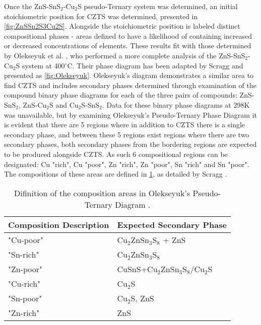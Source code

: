 Once the ZnS-SnS$_2$-Cu$_2$S pseudo-Ternary system was determined, an initial stoichiometric position for CZTS was determined, presented in \ref{fig:ZnSSn2S3Cu2S}. Alongside the stoichiometric position is labeled distinct compositional phases - areas defined to have a likelihood of containing increased or decreased concentrations of elements. These results fit with those determined by Olekseyuk et al. \citep{Olekseyuk2004}, who performed a more complete analysis of the ZnS-SnS$_2$-Cu$_2$S system at 400$^\circ$C. Their phase diagram has been adapted by Scragg \citep{scragg2011copper} and presented as \ref{fig:Olekseyuk}. Olekseyuk's diagram demonstrates a similar area to find CZTS and includes secondary phases determined through examination of the compound binary phase diagrams for each of the three pairs of compounds: ZnS-SnS$_2$, ZnS-Cu$_2$S and Cu$_2$S-SnS$_2$. Data for these binary phase diagrams at 298K was unavailable, but by examining Olekseyuk's Pseudo-Ternary Phase Diagram it is evident that there are 5 regions where in addition to CZTS there is a single secondary phase, and between these 5 regions exist regions where there are two secondary phases, both secondary phases from the bordering regions are expected to be produced alongside CZTS. As such 6 compositional regions can be designated: Cu "rich", Cu "poor", Zn "rich", Zn "poor", Sn "rich" and Sn "poor". The compositions of these areas are defined in \ref{table:Composition}, as detailed by Scragg \citep{scragg2011copper}.


\begin{table}[h]
\centering
\begin{tabular}{@{}ll@{}}
\toprule
Composition Description & Expected Secondary Phase \\ \midrule
"Cu-poor"               & Cu$_2$ZnSn$_3$S$_8$ + ZnS         \\
"Sn-rich"               & Cu$_2$ZnSn$_3$S$_8$               \\
"Zn-poor"               & CuSnS+Cu$_2$ZnSn$_3$S$_8$/Cu$_2$S    \\
"Cu-rich"               & Cu$_2$S                     \\
"Sn-poor"               & Cu$_2$S, ZnS                \\
"Zn-rich"               & ZnS                      \\ \bottomrule
\end{tabular}
\caption{Difinition of the composition areas in Olekseyuk's Pseudo-Ternary Diagram \citep{Olekseyuk2004}.}
\label{table:Composition}
\end{table}


